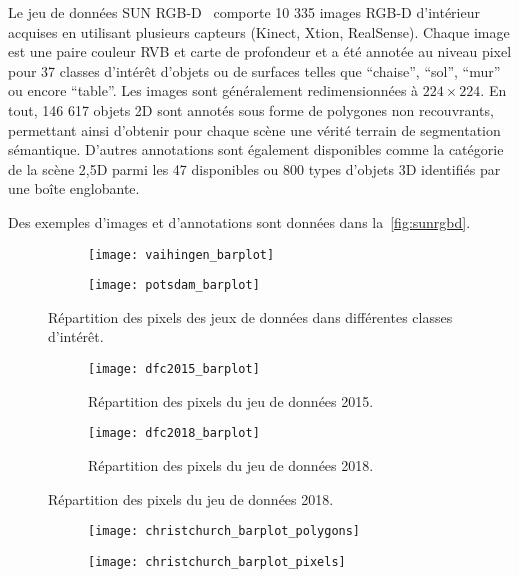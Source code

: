 Le jeu de données SUN RGB-D~\cite{song_sun_2015} comporte 10 335 images \glsdesc{RGB-D} d'intérieur acquises en utilisant plusieurs capteurs (Kinect, Xtion, RealSense). Chaque image est une paire couleur \gls{RVB} et carte de profondeur et a été annotée au niveau pixel pour 37 classes d'intérêt d'objets ou de surfaces telles que ``chaise'', ``sol'', ``mur'' ou encore ``table''. Les images sont généralement redimensionnées à $224\times224$. En tout, 146 617 objets 2D sont annotés sous forme de polygones non recouvrants, permettant ainsi d'obtenir pour chaque scène une vérité terrain de segmentation sémantique. D'autres annotations sont également disponibles comme la catégorie de la scène 2,5D parmi les 47 disponibles ou 800 types d'objets 3D identifiés par une boîte englobante.

Des exemples d'images  et d'annotations sont données dans la~\cref{fig:sunrgbd}.

\begin{figure}[h]
	\begin{subfigure}{0.5\textwidth}
		\texttt{[image: vaihingen\_barplot]}
	\end{subfigure}
	\begin{subfigure}{0.5\textwidth}
		\texttt{[image: potsdam\_barplot]}
	\end{subfigure}
	\caption{Répartition des pixels des jeux de données  dans différentes classes d'intérêt.}
	\label{fig:isprs_barplots}
\end{figure}


\begin{figure}[h]
	\begin{subfigure}[t]{0.5\textwidth}
		\texttt{[image: dfc2015\_barplot]}
		\caption{Répartition des pixels du jeu de données  2015.}
		\label{fig:dfc2015_barplot}
	\end{subfigure}
	\begin{subfigure}[t]{0.5\textwidth}
		\texttt{[image: dfc2018\_barplot]}
		\caption{Répartition des pixels du jeu de données  2018.}
		\label{fig:dfc2018_barplot}
	\end{subfigure}
\end{figure}

\begin{figure}[h]
	\begin{subfigure}{0.5\textwidth}
		\texttt{[image: christchurch\_barplot\_polygons]}
	\end{subfigure}
	\begin{subfigure}{0.5\textwidth}
		\texttt{[image: christchurch\_barplot\_pixels]}
	\end{subfigure}
\end{figure}

%
%
\printbibliography
